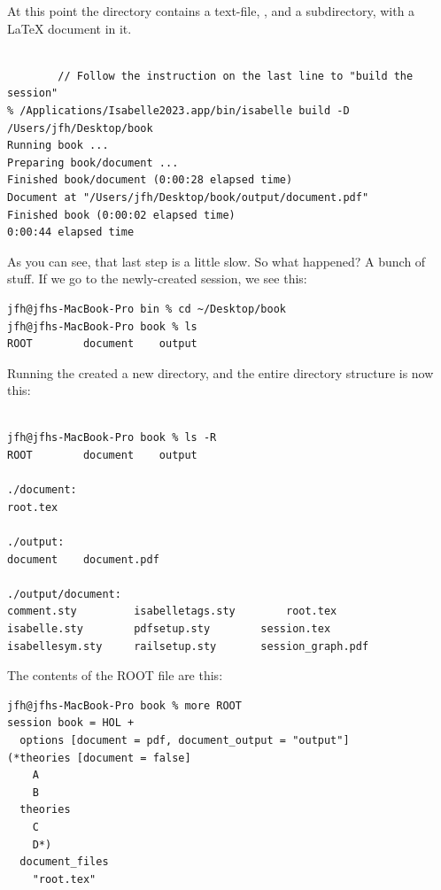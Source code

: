 At this point the  directory contains a text-file, , and a subdirectory,  with a LaTeX document  in it. 

\begin{verbatim}
    
        // Follow the instruction on the last line to "build the session"
% /Applications/Isabelle2023.app/bin/isabelle build -D /Users/jfh/Desktop/book
Running book ...
Preparing book/document ...
Finished book/document (0:00:28 elapsed time)
Document at "/Users/jfh/Desktop/book/output/document.pdf"
Finished book (0:00:02 elapsed time)
0:00:44 elapsed time
\end{verbatim}

As you can see, that last step is a little slow. So what happened? A bunch of stuff. If we go to the newly-created session, we see this:
\begin{verbatim}
jfh@jfhs-MacBook-Pro bin % cd ~/Desktop/book
jfh@jfhs-MacBook-Pro book % ls
ROOT		document	output
\end{verbatim}

Running the  created a new  directory, and the entire directory structure is now this:
\begin{verbatim}
    
jfh@jfhs-MacBook-Pro book % ls -R  
ROOT		document	output

./document:
root.tex

./output:
document	document.pdf

./output/document:
comment.sty			isabelletags.sty		root.tex
isabelle.sty		pdfsetup.sty		session.tex
isabellesym.sty		railsetup.sty		session_graph.pdf
\end{verbatim}

The contents of the ROOT file are this:

\begin{verbatim}
jfh@jfhs-MacBook-Pro book % more ROOT 
session book = HOL +
  options [document = pdf, document_output = "output"]
(*theories [document = false]
    A
    B
  theories
    C
    D*)
  document_files
    "root.tex"    
\end{verbatim}

